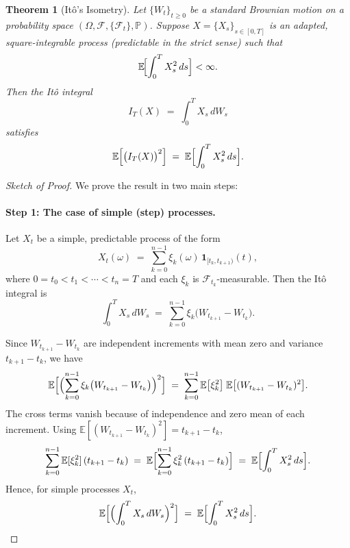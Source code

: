 \documentclass[a4paper,11pt]{book}
\newtheorem{theorem}{Theorem}[section]
\theoremstyle{definition}
\theoremstyle{remark}
\begin{document}
\begin{theorem}[It\^o's Isometry]
\label{thm:ito-isometry}
Let $\{W_t\}_{t \ge 0}$ be a standard Brownian motion on a probability space 
$(\Omega, \mathcal{F}, \{\mathcal{F}_t\}, \mathbb{P})$. 
Suppose $X = \{X_s\}_{s \in [0,T]}$ is an \emph{adapted}, 
square-integrable process (predictable in the strict sense) such that
\[
   \mathbb{E}\!\Bigl[\int_0^T X_s^2 \, ds\Bigr] < \infty.
\]
Then the It\^o integral
\[
   I_T(X) \;=\; \int_0^T X_s \, dW_s
\]
satisfies
\[
   \mathbb{E}\Bigl[\bigl(I_T(X)\bigr)^2\Bigr]
   \;=\;
   \mathbb{E}\Bigl[\int_0^T X_s^2 \, ds\Bigr].
\]
\end{theorem}

\begin{proof}[Sketch of Proof]
We prove the result in two main steps:

\paragraph{Step 1: The case of simple (step) processes.}
Let $X_t$ be a simple, predictable process of the form
\[
  X_t(\omega) \;=\; \sum_{k=0}^{n-1} \xi_k(\omega)\,\mathbf{1}_{[t_k, t_{k+1})}(t),
\]
where $0 = t_0 < t_1 < \cdots < t_n = T$ and each $\xi_k$ is 
$\mathcal{F}_{t_k}$-measurable. Then the It\^o integral is
\[
  \int_0^T X_s \, dW_s 
  \;=\; \sum_{k=0}^{n-1} \xi_k \bigl(W_{t_{k+1}} - W_{t_k}\bigr).
\]

Since $W_{t_{k+1}} - W_{t_k}$ are independent increments with mean zero 
and variance $t_{k+1}-t_k$, we have
\[
  \mathbb{E}\Bigl[\Bigl(\sum_{k=0}^{n-1} 
    \xi_k \bigl(W_{t_{k+1}} - W_{t_k}\bigr)\Bigr)^2\Bigr]
  \;=\;
  \sum_{k=0}^{n-1} 
    \mathbb{E}\bigl[\xi_k^2\bigr]\;\mathbb{E}\bigl[(W_{t_{k+1}} - W_{t_k})^2\bigr].
\]
The cross terms vanish because of independence and zero mean of each increment. 
Using $\mathbb{E}[(W_{t_{k+1}} - W_{t_k})^2] = t_{k+1} - t_k$,
\[
  \sum_{k=0}^{n-1} \mathbb{E}[\xi_k^2]\,(t_{k+1} - t_k)
  \;=\;
  \mathbb{E}\Bigl[ \sum_{k=0}^{n-1} \xi_k^2\,(t_{k+1} - t_k) \Bigr]
  \;=\;
  \mathbb{E}\Bigl[\int_0^T X_s^2 \, ds\Bigr].
\]
Hence, for simple processes $X_t$,
\[
  \mathbb{E}\Bigl[\Bigl(\int_0^T X_s \, dW_s\Bigr)^2\Bigr]
  \;=\;
  \mathbb{E}\Bigl[\int_0^T X_s^2 \, ds\Bigr].
\]


\end{proof}
\end{document}
